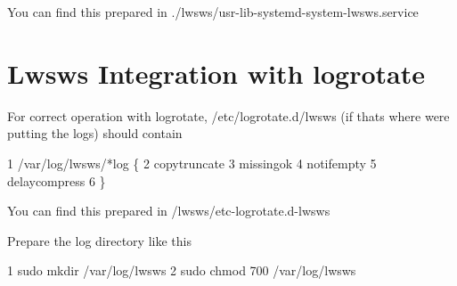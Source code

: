 You can find this prepared in {\ttfamily ./lwsws/usr-\/lib-\/systemd-\/system-\/lwsws.service}\hypertarget{md_README.lwsws_lwswslr}{}\section{Lwsws Integration with logrotate}\label{md_README.lwsws_lwswslr}
For correct operation with logrotate, {\ttfamily /etc/logrotate.d/lwsws} (if that\textquotesingle{}s where we\textquotesingle{}re putting the logs) should contain 
\begin{DoxyCode}
1 /var/log/lwsws/*log \{
2     copytruncate
3     missingok
4     notifempty
5     delaycompress
6 \}
\end{DoxyCode}
 You can find this prepared in {\ttfamily /lwsws/etc-\/logrotate.d-\/lwsws}

Prepare the log directory like this


\begin{DoxyCode}
1 sudo mkdir /var/log/lwsws
2 sudo chmod 700 /var/log/lwsws
\end{DoxyCode}
 